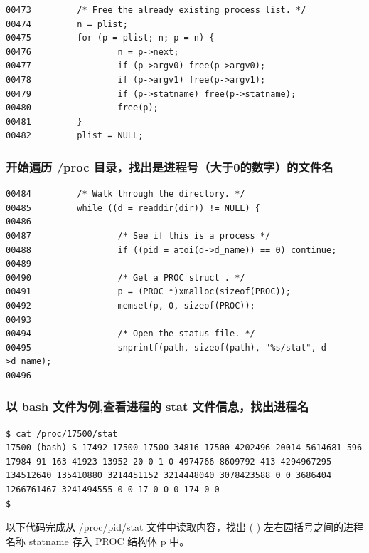 {\begin{shaded}\begin{verbatim}
00473         /* Free the already existing process list. */
00474         n = plist;
00475         for (p = plist; n; p = n) {
00476                 n = p->next;
00477                 if (p->argv0) free(p->argv0);
00478                 if (p->argv1) free(p->argv1);
00479                 if (p->statname) free(p->statname);
00480                 free(p);
00481         }
00482         plist = NULL;
\end{verbatim}\end{shaded}}
\subsubsection{开始遍历 /proc 目录，找出是进程号（大于0的数字）的文件名}

{\begin{shaded}\begin{verbatim}
00484         /* Walk through the directory. */
00485         while ((d = readdir(dir)) != NULL) {
00486 
00487                 /* See if this is a process */
00488                 if ((pid = atoi(d->d_name)) == 0) continue;
00489 
00490                 /* Get a PROC struct . */
00491                 p = (PROC *)xmalloc(sizeof(PROC));
00492                 memset(p, 0, sizeof(PROC));
00493 
00494                 /* Open the status file. */
00495                 snprintf(path, sizeof(path), "%s/stat", d->d_name);
00496 
\end{verbatim}\end{shaded}}
\subsubsection{以 bash 文件为例,查看进程的 stat 文件信息，找出进程名}

{\begin{shaded}\begin{verbatim}
$ cat /proc/17500/stat
17500 (bash) S 17492 17500 17500 34816 17500 4202496 20014 5614681 596 17984 91 163 41923 13952 20 0 1 0 4974766 8609792 413 4294967295 134512640 135410880 3214451152 3214448040 3078423588 0 0 3686404 1266761467 3241494555 0 0 17 0 0 0 174 0 0
$ 
\end{verbatim}\end{shaded}}
以下代码完成从 /proc/pid/stat 文件中读取内容，找出 ( )
左右园括号之间的进程名称 statname 存入 PROC 结构体 p 中。

